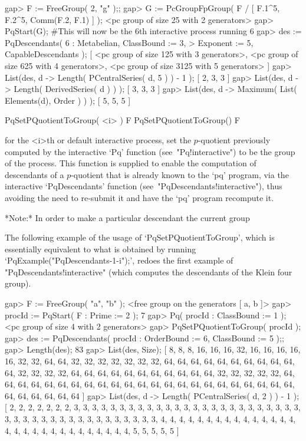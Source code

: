 \beginexample
gap> F := FreeGroup( 2, "g" );;
gap> G := PcGroupFpGroup( F / [ F.1^5, F.2^5, Comm(F.2, F.1) ] );
<pc group of size 25 with 2 generators>
gap> PqStart(G); #This will now be the 6th interactive process running
6
gap> des := PqDescendants( 6 : Metabelian, ClassBound := 3,
>                              Exponent := 5, CapableDescendants );
[ <pc group of size 125 with 3 generators>, 
  <pc group of size 625 with 4 generators>, 
  <pc group of size 3125 with 5 generators> ]
gap> List(des, d -> Length( PCentralSeries( d, 5 ) ) - 1 );
[ 2, 3, 3 ]
gap> List(des, d -> Length( DerivedSeries( d ) ) );
[ 3, 3, 3 ]
gap> List(des, d -> Maximum( List( Elements(d), Order ) ) );
[ 5, 5, 5 ]
\endexample

\>PqSetPQuotientToGroup( <i> ) F
\>PqSetPQuotientToGroup() F

for  the  <i>th  or  default  interactive  {\ANUPQ}  process,   set   the
$p$-quotient  previously  computed  by  the  interactive  `Pq'   function
(see~"Pq!interactive") to be the group of the process. This  function  is
supplied to enable the computation of descendants of a $p$-quotient  that
is already known to the `pq' program, via the interactive  `PqDescendants'
function (see~"PqDescendants!interactive"), thus  avoiding  the  need  to
re-submit it and have the `pq' program recompute it.

*Note:* In order to make a particular descendant the current group 


The following example of the usage of `PqSetPQuotientToGroup',  which  is
essentially   equivalent    to    what    is    obtained    by    running
`PqExample("PqDescendants-1-i");',   redoes   the   first   example    of
"PqDescendants!interactive" (which computes the descendants of the  Klein
four group).

\beginexample
gap> F := FreeGroup( "a", "b" );
<free group on the generators [ a, b ]>
gap> procId := PqStart( F : Prime := 2 );
7
gap> Pq( procId : ClassBound := 1 );
<pc group of size 4 with 2 generators>
gap> PqSetPQuotientToGroup( procId );
gap> des := PqDescendants( procId : OrderBound := 6, ClassBound := 5 );;
gap> Length(des);
83
gap> List(des, Size);
[ 8, 8, 8, 16, 16, 16, 32, 16, 16, 16, 16, 16, 32, 32, 64, 64, 32, 32, 32, 
  32, 32, 32, 32, 64, 64, 64, 64, 64, 64, 64, 64, 64, 64, 64, 32, 32, 32, 32, 
  64, 64, 64, 64, 64, 64, 64, 64, 64, 64, 64, 32, 32, 32, 32, 32, 64, 64, 64, 
  64, 64, 64, 64, 64, 64, 64, 64, 64, 64, 64, 64, 64, 64, 64, 64, 64, 64, 64, 
  64, 64, 64, 64, 64, 64, 64 ]
gap> List(des, d -> Length( PCentralSeries( d, 2 ) ) - 1 );
[ 2, 2, 2, 2, 2, 2, 2, 3, 3, 3, 3, 3, 3, 3, 3, 3, 3, 3, 3, 3, 3, 3, 3, 3, 3, 
  3, 3, 3, 3, 3, 3, 3, 3, 3, 3, 3, 3, 3, 3, 3, 3, 3, 3, 3, 3, 3, 3, 3, 3, 4, 
  4, 4, 4, 4, 4, 4, 4, 4, 4, 4, 4, 4, 4, 4, 4, 4, 4, 4, 4, 4, 4, 4, 4, 4, 4, 
  4, 4, 4, 5, 5, 5, 5, 5 ]
\endexample

